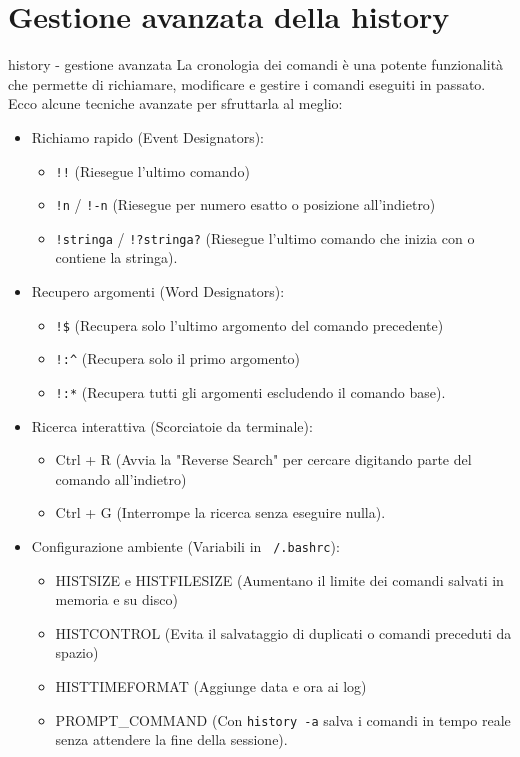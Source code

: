 \section{Gestione avanzata della history}
\begin{frame}{history - gestione avanzata}
 La cronologia dei comandi è una potente funzionalità che permette di 
 richiamare, modificare e gestire i comandi eseguiti in passato. Ecco alcune 
 tecniche avanzate per sfruttarla al meglio:

\begin{itemize}
	\item Richiamo rapido (Event Designators): 
	\begin{itemize}
	\item \verb|!!| (Riesegue l'ultimo comando) \item \verb|!n| / \verb|!-n| (Riesegue per numero esatto o posizione all'indietro) \item \verb|!stringa| / \verb|!?stringa?| (Riesegue l'ultimo comando che inizia con o contiene la stringa).
	\end{itemize} 
	\item Recupero argomenti (Word Designators): 
	\begin{itemize}
	\item \verb|!$| (Recupera solo l'ultimo argomento del comando precedente) \item \verb|!:^| (Recupera solo il primo argomento) \item \verb|!:*| (Recupera tutti gli argomenti escludendo il comando base).
	\end{itemize}
	\item Ricerca interattiva (Scorciatoie da terminale):
	\begin{itemize}
	\item Ctrl + R (Avvia la "Reverse Search" per cercare digitando parte del comando all'indietro) \item Ctrl + G (Interrompe la ricerca senza eseguire nulla).
	\end{itemize}
	\item Configurazione ambiente (Variabili in \texttt{~/.bashrc}):
	\begin{itemize}
	\item HISTSIZE e HISTFILESIZE (Aumentano il limite dei comandi salvati in memoria e su disco) \item HISTCONTROL (Evita il salvataggio di duplicati o comandi preceduti da spazio) \item HISTTIMEFORMAT (Aggiunge data e ora ai log) \item PROMPT\_COMMAND (Con \texttt{history -a} salva i comandi in tempo reale senza attendere la fine della sessione).

\end{itemize}
\end{itemize}
\end{frame}
